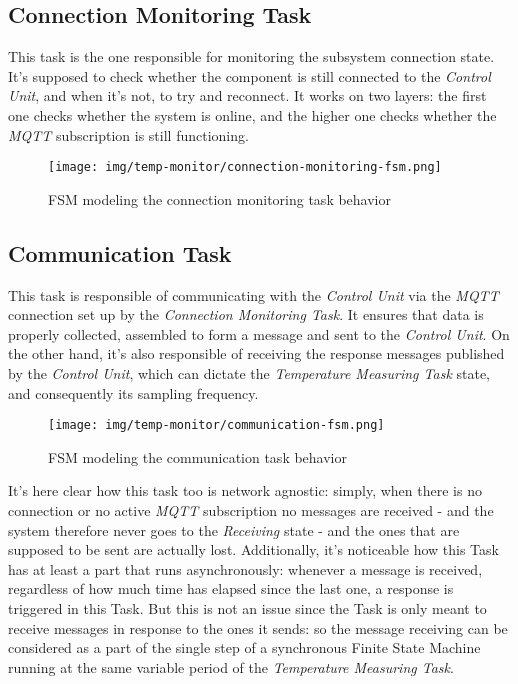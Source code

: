 \documentclass[a4paper,12pt]{report}
\begin{document}
		\subsection{Connection Monitoring Task}
		This task is the one responsible for monitoring the subsystem connection state. It's supposed to check whether the component is still connected to the \textit{Control Unit}, and when it's not, to try and reconnect. It works on two layers: the first one checks whether the system is online, and the higher one checks whether the \textit{MQTT} subscription is still functioning.
		\begin{figure}[H]
			\centering{}
			\texttt{[image: img/temp-monitor/connection-monitoring-fsm.png]}
			\caption{FSM modeling the connection monitoring task behavior}
			\label{img:temp-monitor/connection-monitoring-fsm}
		\end{figure}
		\subsection{Communication Task}
		This task is responsible of communicating with the \textit{Control Unit} via the \textit{MQTT} connection set up by the \textit{Connection Monitoring Task}. It ensures that data is properly collected, assembled to form a message and sent to the \textit{Control Unit}. On the other hand, it's also responsible of receiving the response messages published by the \textit{Control Unit}, which can dictate the \textit{Temperature Measuring Task} state, and consequently its sampling frequency.
		\begin{figure}[H]
			\centering{}
			\texttt{[image: img/temp-monitor/communication-fsm.png]}
			\caption{FSM modeling the communication task behavior}
			\label{img:temp-monitor/communication-fsm}
		\end{figure}
		It's here clear how this task too is network agnostic: simply, when there is no connection or no active \textit{MQTT} subscription no messages are received - and the system therefore never goes to the \textit{Receiving} state - and the ones that are supposed to be sent are actually lost.
		\newline Additionally, it's noticeable how this Task has at least a part that runs asynchronously: whenever a message is received, regardless of how much time has elapsed since the last one, a response is triggered in this Task. But this is not an issue since the Task is only meant to receive messages in response to the ones it sends: so the message receiving can be considered as a part of the single step of a synchronous Finite State Machine running at the same variable period of the \textit{Temperature Measuring Task}.
\end{document}
